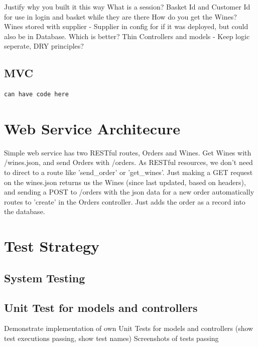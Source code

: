 \documentclass[12pt]{article}
\begin{document}
Justify why you built it this way
What is a session? Basket Id and Customer Id for use in login and basket while they are there
How do you get the Wines?
Wines stored with supplier - Supplier in config for if it was deployed, but could also be in Database. Which is better?
Thin Controllers and models - Keep logic seperate, DRY principles?

\subsection{MVC}
\begin{lstlisting}
can have code here
\end{lstlisting}


\section{Web Service Architecure}

Simple web service has two RESTful routes, Orders and Wines. Get Wines with /wines.json, and send Orders with /orders. As RESTful resources, we don't need to direct to a route like 'send\_order' or 'get\_wines'. Just making a GET request on the wines.json returns us the Wines (since last updated, based on headers), and sending a POST to /orders with the json data for a new order automatically routes to 'create' in the Orders controller. Just adds the order as a record into the database.




\section{Test Strategy}
\subsection{System Testing}

\subsection{Unit Test for models and controllers}
Demonstrate implementation of own Unit Tests for models and controllers (show test executions passing, show test names)
Screenshots of tests passing
\end{document}
